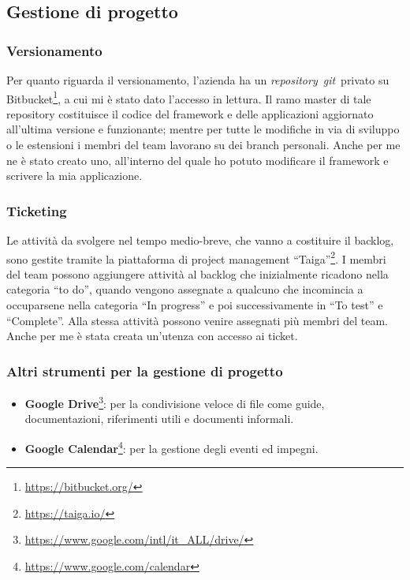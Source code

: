     \subsection{Gestione di progetto}
        \subsubsection{Versionamento}
        Per quanto riguarda il versionamento, l'azienda ha un \emph{\gls{repository}}\glsfirstoccur\ \emph{\gls{git}}\glsfirstoccur\ privato su Bitbucket\footnote{{\color{blue} \url{https://bitbucket.org/}}}, a cui mi è stato dato l'accesso in lettura. Il ramo master di tale repository costituisce il codice del framework e delle applicazioni aggiornato all'ultima versione e funzionante; mentre per tutte le modifiche in via di sviluppo o le estensioni i membri del team lavorano su dei branch personali. Anche per me ne è stato creato uno, all'interno del quale ho potuto modificare il framework e scrivere la mia applicazione.
        
        \subsubsection{Ticketing}
        Le attività da svolgere nel tempo medio-breve, che vanno a costituire il backlog, sono gestite tramite la piattaforma di project management ``Taiga''\footnote{{\color{blue} \url{https://taiga.io/}}}. I membri del team possono aggiungere attività al backlog che inizialmente ricadono nella categoria ``to do'', quando vengono assegnate a qualcuno che incomincia a occuparsene nella categoria ``In progress'' e poi successivamente in ``To test'' e ``Complete''. Alla stessa attività possono venire assegnati più membri del team.
        Anche per me è stata creata un'utenza con accesso ai ticket.
                
        \subsubsection{Altri strumenti per la gestione di progetto}
        \begin{itemize}
            \item \textbf{Google Drive}\footnote{{\color{blue} \url{https://www.google.com/intl/it\_ALL/drive/}}}: per la condivisione veloce di file come guide, documentazioni, riferimenti utili e documenti informali.
            \item \textbf{Google Calendar}\footnote{{\color{blue} \url{https://www.google.com/calendar}}}: per la gestione degli eventi ed impegni.
        \end{itemize}
    
